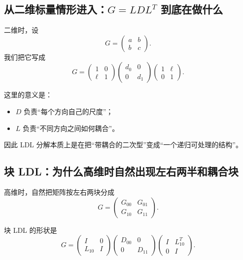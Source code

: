 \documentclass[11pt,a4paper]{ctexart}
\begin{document}
\subsection{从二维标量情形进入：\(G=L D L^T\) 到底在做什么}

二维时，设
\[
G=
\begin{pmatrix}
a & b\\
b & c
\end{pmatrix}.
\]
我们把它写成
\[
G=
\begin{pmatrix}
1 & 0\\
\ell & 1
\end{pmatrix}
\begin{pmatrix}
d_0 & 0\\
0 & d_1
\end{pmatrix}
\begin{pmatrix}
1 & \ell\\
0 & 1
\end{pmatrix}.
\]

这里的意义是：

\begin{itemize}
    \item \(D\) 负责“每个方向自己的尺度”；
    \item \(L\) 负责“不同方向之间如何耦合”。
\end{itemize}

因此 LDL 分解本质上是在把“带耦合的二次型”变成“一个递归可处理的结构”。

\subsection{块 LDL：为什么高维时自然出现左右两半和耦合块}

高维时，自然把矩阵按左右两块分成
\[
G=
\begin{pmatrix}
G_{00} & G_{01}\\
G_{10} & G_{11}
\end{pmatrix}.
\]

块 LDL 的形状是
\[
G=
\begin{pmatrix}
I & 0\\
L_{10} & I
\end{pmatrix}
\begin{pmatrix}
D_{00} & 0\\
0 & D_{11}
\end{pmatrix}
\begin{pmatrix}
I & L_{10}^T\\
0 & I
\end{pmatrix}.
\]
\end{document}
